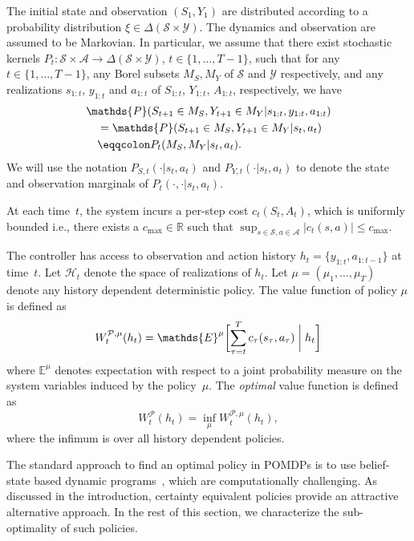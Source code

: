 \documentclass[letterpaper, 10pt]{IEEEtran}
\theoremstyle{plain}
\theoremstyle{nonumberplain}
\theoremstyle{plain}
\newcommand*\ALPHABET{\mathcal}
\newcommand*\PR{\mathds{P}}
\newcommand*\EXP{\mathds{E}}
\newcommand*\reals{\mathds{R}}
\begin{document}
The initial state and observation $(S_1, Y_1)$ are distributed according to a probability distribution $\xi \in \Delta(\ALPHABET S \times \ALPHABET Y)$. The dynamics and observation are assumed to be Markovian.
In particular, we assume that there exist stochastic kernels $P_t \colon \ALPHABET S \times \ALPHABET A \to \Delta(\ALPHABET S \times \ALPHABET Y)$, $t \in \{1, \dots, T-1\}$, such that for any $t \in \{1, \dots, T-1\}$, any Borel subsets $M_S, M_Y$ of $\ALPHABET S$ and $\ALPHABET Y$ respectively, and any realizations $s_{1:t}$, $y_{1:t}$ and $a_{1:t}$ of $S_{1:t}$, $Y_{1:t}$, $A_{1:t}$, respectively, we have
\begin{align}
    \hskip 1em & \hskip -1em
    \PR(S_{t+1} \in M_S, Y_{t+1} \in M_Y | s_{1:t}, y_{1:t}, a_{1:t})
    \notag \\
    &=
    \PR(S_{t+1} \in M_S, Y_{t+1} \in M_Y | s_{t}, a_{t})
    \notag\\
    &\eqqcolon P_t(M_S, M_Y | s_t,a_t).
\end{align}
We will use the notation $P_{S,t}(\cdot | s_t, a_t)$ and $P_{Y,t}(\cdot | s_t,a_t)$ to denote the state and observation marginals of $P_t(\cdot, \cdot | s_t,a_t)$. 

At each time~$t$, the system incurs a per-step cost $c_t(S_t,A_t)$, which is uniformly bounded i.e., there exists a $c_{\max} \in \reals$ such that $\sup_{s \in \ALPHABET S, a \in \ALPHABET A} |c_t(s,a)| \le c_{\max}$.

The controller has access to observation and action history $h_t = \{y_{1:t}, a_{1:t-1}\}$ at time~$t$. Let $\ALPHABET H_t$ denote the space of realizations of $h_t$. Let $\mu = (\mu_1, \dots, \mu_T)$ denote any history dependent deterministic policy. The value function of policy $\mu$ is defined as
\[
    W^{\ALPHABET P, \mu}_t(h_t) = \EXP^{\mu}\biggl[ \sum_{\tau = t}^T c_{\tau}(s_{\tau}, a_{\tau}) \biggm| h_t \biggr]
\]
where $\EXP^{\mu}$ denotes expectation with respect to a joint probability measure on the system variables induced by the policy~$\mu$.
The \emph{optimal} value function is defined as
\[
    W^{\ALPHABET  P}_t(h_t) = \inf_{\mu} W^{\ALPHABET P, \mu}_t(h_t),
\]
where the infimum is over all history dependent policies. 

The standard approach to find an optimal policy in POMDPs is to use belief-state based dynamic programs~\cite{Astrom1965,Smallwood1973}, which are computationally challenging. As discussed in the introduction, certainty equivalent policies provide an attractive alternative approach. In the rest of this section, we characterize the sub-optimality of such policies. 
\end{document}
